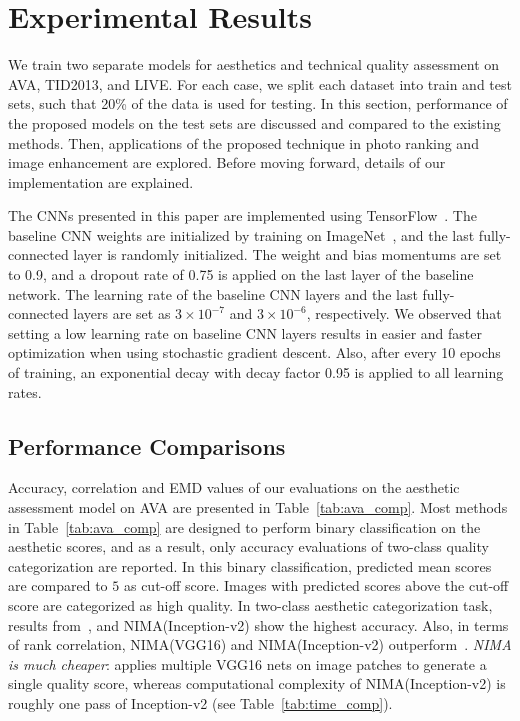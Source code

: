 \documentclass[10pt,twocolumn,twoside]{IEEEtran}
\begin{document}
\section{Experimental Results}
\label{sec:results}
\vspace{0 mm}

We train two separate models for aesthetics and technical quality assessment on AVA, TID2013, and LIVE. For each case, we split each dataset into train and test sets, such that 20\% of the data is used for testing. In this section, performance of the proposed models on the test sets are discussed and compared to the existing methods. Then, applications of the proposed technique in photo ranking and image enhancement are explored. Before moving forward, details of our implementation are explained.

The CNNs presented in this paper are implemented using TensorFlow~\cite{abadi2016tensorflow, abadi2016tensorflow2}. The baseline CNN weights are initialized by training on ImageNet~\cite{krizhevsky2012imagenet}, and the last fully-connected layer is randomly initialized. The weight and bias momentums are set to 0.9, and a dropout rate of 0.75 is applied on the last layer of the baseline network. The learning rate of the baseline CNN layers and the last fully-connected layers are set as $3\times10^{-7}$ and $3\times 10^{-6}$, respectively. We observed that setting a low learning rate on baseline CNN layers results in easier and faster optimization when using stochastic gradient descent. Also, after every 10 epochs of training, an exponential decay with decay factor 0.95 is applied to all learning rates.

\subsection{Performance Comparisons}
\label{sec:performance}
\vspace{0 mm}

Accuracy, correlation and EMD values of our evaluations on the aesthetic assessment model on AVA are presented in Table~\ref{tab:ava_comp}. Most methods in Table~\ref{tab:ava_comp} are designed to perform binary classification on the aesthetic scores, and as a result, only accuracy evaluations of two-class quality categorization are reported. In this binary classification, predicted mean scores are compared to $5$ as cut-off score. Images with predicted scores above the cut-off score are categorized as high quality. In two-class aesthetic categorization task, results from~\cite{ma2017lamp}, and NIMA(Inception-v2) show the highest accuracy. Also, in terms of rank correlation, NIMA(VGG16) and NIMA(Inception-v2) outperform~\cite{kong2016photo}. \emph{NIMA is much cheaper}: \cite{ma2017lamp} applies multiple VGG16 nets on image patches to generate a single quality score, whereas computational complexity of NIMA(Inception-v2) is roughly one pass of Inception-v2 (see Table~\ref{tab:time_comp}).
\end{document}
